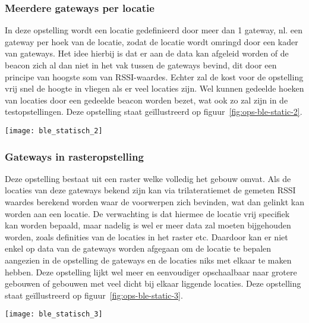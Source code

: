 \subsubsection{Meerdere gateways per locatie}
\begin{minipage}{0.65\textwidth}
In deze opstelling wordt een locatie gedefinieerd door meer dan 1 gateway, nl. een gateway per hoek van de locatie, zodat de locatie wordt omringd door een kader van gateways. Het idee hierbij is dat er aan de data kan afgeleid worden of de beacon zich al dan niet in het vak tussen de gateways bevind, dit door een principe van hoogste som van RSSI-waardes. Echter zal de kost voor de opstelling vrij snel de hoogte in vliegen als er veel locaties zijn. Wel kunnen gedeelde hoeken van locaties door een gedeelde beacon worden bezet, wat ook zo zal zijn in de testopstellingen. Deze opstelling staat geïllustreerd op figuur~\ref{fig:ops-ble-static-2}.
\end{minipage}
\hfill
\begin{minipage}{0.30\textwidth}
	\texttt{[image: ble\_statisch\_2]}
	\label{fig:ops-ble-static-2}
\end{minipage}

\subsubsection{Gateways in rasteropstelling}
\begin{minipage}{0.65\textwidth}
Deze opstelling bestaat uit een raster welke volledig het gebouw omvat. Als de locaties van deze gateways bekend zijn kan via trilateratie\footnotemark met de gemeten RSSI waardes berekend worden waar de voorwerpen zich bevinden, wat dan gelinkt kan worden aan een locatie. De verwachting is dat hiermee de locatie vrij specifiek kan worden bepaald, maar nadelig is wel er meer data zal moeten bijgehouden worden, zoals definities van de locaties in het raster etc. Daardoor kan er niet enkel op data van de gateways worden afgegaan om de locatie te bepalen aangezien in de opstelling de gateways en de locaties niks met elkaar te maken hebben. Deze opstelling lijkt wel meer en eenvoudiger opschaalbaar naar grotere gebouwen of gebouwen met veel dicht bij elkaar liggende locaties. Deze opstelling staat geïllustreerd op figuur~\ref{fig:ops-ble-static-3}.
\end{minipage}
\hfill
\begin{minipage}{0.30\textwidth}
	\texttt{[image: ble\_statisch\_3]}
	\label{fig:ops-ble-static-3}
\end{minipage}


